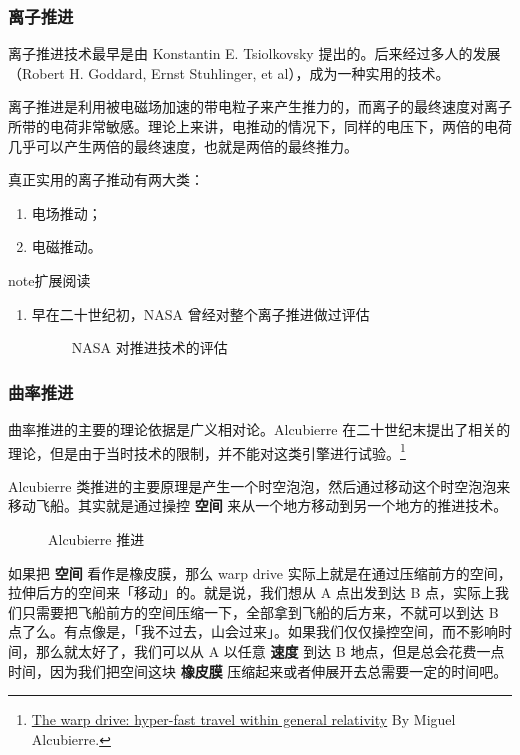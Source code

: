 \documentclass[letterpaper,10pt]{sphinxmanual}
\begin{document}
\subsubsection{离子推进}
\label{tech:id18}
离子推进技术最早是由 Konstantin E. Tsiolkovsky 提出的。后来经过多人的发展（Robert H. Goddard, Ernst Stuhlinger, et al），成为一种实用的技术。

离子推进是利用被电磁场加速的带电粒子来产生推力的，而离子的最终速度对离子所带的电荷非常敏感。理论上来讲，电推动的情况下，同样的电压下，两倍的电荷几乎可以产生两倍的最终速度，也就是两倍的最终推力。

真正实用的离子推动有两大类：
\begin{enumerate}
\item {} 
电场推动；

\item {} 
电磁推动。

\end{enumerate}

\begin{notice}{note}{扩展阅读}
\begin{enumerate}
\item {} 
早在二十世纪初，NASA 曾经对整个离子推进做过评估
\begin{figure}[htbp]
\centering
\capstart
\caption{NASA 对推进技术的评估}\end{figure}

\end{enumerate}
\end{notice}


\subsubsection{曲率推进}
\label{tech:id19}\label{tech:index-10}
曲率推进的主要的理论依据是广义相对论。Alcubierre 在二十世纪末提出了相关的理论，但是由于当时技术的限制，并不能对这类引擎进行试验。\footnote{
\href{http://arxiv.org/abs/gr-qc/0009013}{The warp drive: hyper-fast travel within general relativity} By Miguel Alcubierre.
}

Alcubierre 类推进的主要原理是产生一个时空泡泡，然后通过移动这个时空泡泡来移动飞船。其实就是通过操控 \textbf{空间} 来从一个地方移动到另一个地方的推进技术。
\begin{figure}[htbp]
\centering
\capstart
\caption{Alcubierre 推进}\end{figure}

如果把 \textbf{空间} 看作是橡皮膜，那么 warp drive 实际上就是在通过压缩前方的空间，拉伸后方的空间来「移动」的。就是说，我们想从 A 点出发到达 B 点，实际上我们只需要把飞船前方的空间压缩一下，全部拿到飞船的后方来，不就可以到达 B 点了么。有点像是，「我不过去，山会过来」。如果我们仅仅操控空间，而不影响时间，那么就太好了，我们可以从 A 以任意 \textbf{速度} 到达 B 地点，但是总会花费一点时间，因为我们把空间这块 \textbf{橡皮膜} 压缩起来或者伸展开去总需要一定的时间吧。
\end{document}
